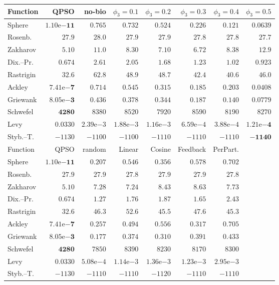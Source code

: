 \begin{tabular}{lrrrrrrr}
\toprule
Function & QPSO & no-bio & $\phi_3=0.1$ & $\phi_3=0.2$ & $\phi_3=0.3$ & $\phi_3=0.4$ & $\phi_3=0.5$ \\
\midrule
Sphere & $\mathbf{1.10\mathrm{e}{-11}}$ & $0.765$ & $0.732$ & $0.524$ & $0.226$ & $0.121$ & $0.0639$ \\
Rosenb. & $27.9$ & $28.0$ & $27.9$ & $27.9$ & $27.8$ & $27.8$ & $\mathbf{27.7}$ \\
Zakharov & $\mathbf{5.10}$ & $11.0$ & $8.30$ & $7.10$ & $6.72$ & $8.38$ & $12.9$ \\
Dix.--Pr. & $\mathbf{0.674}$ & $2.61$ & $2.05$ & $1.68$ & $1.23$ & $1.02$ & $0.923$ \\
Rastrigin & $\mathbf{32.6}$ & $62.8$ & $48.9$ & $48.7$ & $42.4$ & $40.6$ & $46.0$ \\
Ackley & $\mathbf{7.41\mathrm{e}{-7}}$ & $0.714$ & $0.545$ & $0.315$ & $0.185$ & $0.203$ & $0.0408$ \\
Griewank & $\mathbf{8.05\mathrm{e}{-3}}$ & $0.436$ & $0.378$ & $0.344$ & $0.187$ & $0.140$ & $0.0779$ \\
Schwefel & $\mathbf{4280}$ & $8380$ & $8520$ & $7920$ & $8590$ & $8190$ & $8270$ \\
Levy & $0.0330$ & $2.39\mathrm{e}{-3}$ & $1.88\mathrm{e}{-3}$ & $1.16\mathrm{e}{-3}$ & $6.59\mathrm{e}{-4}$ & $3.88\mathrm{e}{-4}$ & $\mathbf{1.21\mathrm{e}{-4}}$ \\
Styb.--T. & $-1130$ & $-1100$ & $-1100$ & $-1110$ & $-1110$ & $-1110$ & $-\mathbf{1140}$ \\
\midrule
Function & QPSO & random & Linear & Cosine & Feedback & PerPart. &  \\
\midrule
Sphere & $\mathbf{1.10\mathrm{e}{-11}}$ & $0.207$ & $0.546$ & $0.356$ & $0.578$ & $0.702$ &  \\
Rosenb. & $27.9$ & $27.9$ & $27.8$ & $27.9$ & $27.9$ & $27.8$ &  \\
Zakharov & $\mathbf{5.10}$ & $7.28$ & $7.24$ & $8.43$ & $8.63$ & $7.73$ &  \\
Dix.--Pr. & $\mathbf{0.674}$ & $1.27$ & $1.76$ & $1.87$ & $1.65$ & $2.43$ &  \\
Rastrigin & $\mathbf{32.6}$ & $46.3$ & $52.6$ & $45.5$ & $47.6$ & $45.3$ &  \\
Ackley & $\mathbf{7.41\mathrm{e}{-7}}$ & $0.257$ & $0.494$ & $0.556$ & $0.317$ & $0.705$ &  \\
Griewank & $\mathbf{8.05\mathrm{e}{-3}}$ & $0.177$ & $0.374$ & $0.310$ & $0.391$ & $0.433$ &  \\
Schwefel & $\mathbf{4280}$ & $7850$ & $8390$ & $8230$ & $8170$ & $8300$ &  \\
Levy & $0.0330$ & $5.08\mathrm{e}{-4}$ & $1.14\mathrm{e}{-3}$ & $1.36\mathrm{e}{-3}$ & $1.23\mathrm{e}{-3}$ & $2.95\mathrm{e}{-3}$ &  \\
Styb.--T. & $-1130$ & $-1110$ & $-1110$ & $-1120$ & $-1110$ & $-1110$ &  \\
\bottomrule
\end{tabular}
